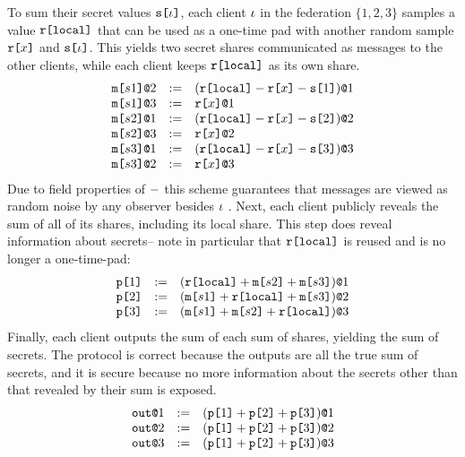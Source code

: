 To sum their secret values $\texttt{s[}\iota\texttt{]}$, each client $\iota$ in
the federation $\{ 1, 2, 3 \}$  samples a value $\texttt{r[}\mathtt{local}\texttt{]}$
that can be used as a one-time pad with another
random sample $\texttt{r[}x\texttt{]}$ and $\texttt{s[}\iota\texttt{]}$. This yields
two secret shares communicated as messages to the other clients,
while each client keeps $\texttt{r[}\mathtt{local}\texttt{]}$ as its own share.
$$
\begin{array}{lll}
  \texttt{m[}s1\texttt{]}\texttt{@}2 &:=& (\texttt{r[}\mathtt{local}\texttt{]} - \texttt{r[}x\texttt{]} - \texttt{s[}1\texttt{]})\texttt{@}1 \\ 
  \texttt{m[}s1\texttt{]}\texttt{@}3 &:=& \texttt{r[}x\texttt{]}\texttt{@}1 \\ 
  \texttt{m[}s2\texttt{]}\texttt{@}1 &:=& (\texttt{r[}\mathtt{local}\texttt{]} - \texttt{r[}x\texttt{]} - \texttt{s[}2\texttt{]})\texttt{@}2 \\ 
  \texttt{m[}s2\texttt{]}\texttt{@}3 &:=& \texttt{r[}x\texttt{]}\texttt{@}2 \\ 
  \texttt{m[}s3\texttt{]}\texttt{@}1 &:=& (\texttt{r[}\mathtt{local}\texttt{]} - \texttt{r[}x\texttt{]} - \texttt{s[}3\texttt{]})\texttt{@}3 \\ 
  \texttt{m[}s3\texttt{]}\texttt{@}2 &:=& \texttt{r[}x\texttt{]}\texttt{@}3
\end{array}
$$
Due to field properties of $-$ this scheme guarantees that messages
are viewed as random noise by any observer 
besides $\iota$ \cite{barthe2019probabilistic}. Next, each client
publicly reveals the sum of all of its shares, including its local
share. This step does reveal information about secrets-- note in
particular that $\texttt{r[}\mathtt{local}\texttt{]}$ is reused and is no longer a one-time-pad:
$$
\begin{array}{lll}
  \texttt{p[}1\texttt{]} &:=& (\texttt{r[}\mathtt{local}\texttt{]} + \texttt{m[}s2\texttt{]} + \texttt{m[}s3\texttt{]})\texttt{@}1 \\ 
  \texttt{p[}2\texttt{]} &:=& (\texttt{m[}s1\texttt{]} + \texttt{r[}\mathtt{local}\texttt{]} + \texttt{m[}s3\texttt{]})\texttt{@}2 \\
  \texttt{p[}3\texttt{]} &:=& (\texttt{m[}s1\texttt{]} + \texttt{m[}s2\texttt{]} + \texttt{r[}\mathtt{local}\texttt{]})\texttt{@}3 
\end{array}
$$
Finally, each client outputs the sum of each sum of shares, yielding
the sum of secrets. The protocol is correct because the outputs are all the
true sum of secrets, and it is secure because no more information about the
secrets other than that revealed by their sum is exposed.
$$
\begin{array}{lll}
  \texttt{out}\texttt{@}1 &:=& (\texttt{p[}1\texttt{]} + \texttt{p[}2\texttt{]} + \texttt{p[}3\texttt{]})\texttt{@}1\\
  \texttt{out}\texttt{@}2 &:=& (\texttt{p[}1\texttt{]} + \texttt{p[}2\texttt{]} + \texttt{p[}3\texttt{]})\texttt{@}2\\
  \texttt{out}\texttt{@}3 &:=& (\texttt{p[}1\texttt{]} + \texttt{p[}2\texttt{]} + \texttt{p[}3\texttt{]})\texttt{@}3
\end{array}
$$
